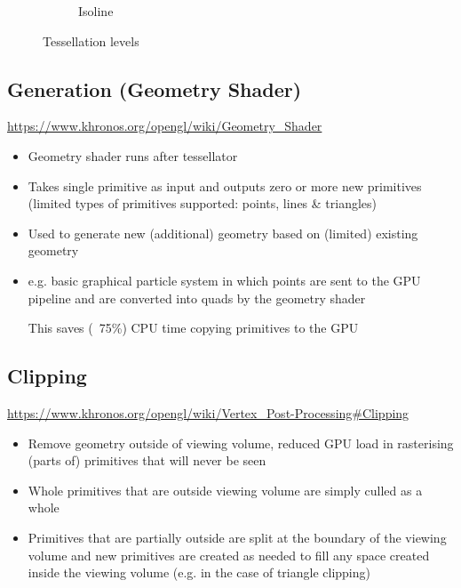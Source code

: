 \documentclass[a4paper]{article}
\begin{document}
\begin{figure}[h]
\begin{subfigure}[b]{0.3\textwidth}
    \caption{Isoline}
  \end{subfigure}

  \caption{Tessellation levels}
  \label{fig:tess_levels}
\end{figure}
\FloatBarrier

\subsection{Generation (Geometry Shader)}

\url{https://www.khronos.org/opengl/wiki/Geometry_Shader}

\begin{itemize}
  \item
    Geometry shader runs after tessellator

  \item
    Takes single primitive as input and outputs zero or more new primitives
    (limited types of primitives supported: points, lines \& triangles)

  \item
    Used to generate new (additional) geometry based on (limited) existing
    geometry

  \item
    e.g. basic graphical particle system in which points are sent to the GPU
    pipeline and are converted into quads by the geometry shader

    This saves (~75\%) CPU time copying primitives to the GPU

\end{itemize}

\subsection{Clipping}

\url{https://www.khronos.org/opengl/wiki/Vertex_Post-Processing#Clipping}

\begin{itemize}
  \item
    Remove geometry outside of viewing volume, reduced GPU load in rasterising
    (parts of) primitives that will never be seen

  \item
    Whole primitives that are outside viewing volume are simply culled as a
    whole

  \item
    Primitives that are partially outside are split at the boundary of the
    viewing volume and new primitives are created as needed to fill any space
    created inside the viewing volume (e.g. in the case of triangle clipping)

\end{itemize}
\end{document}
